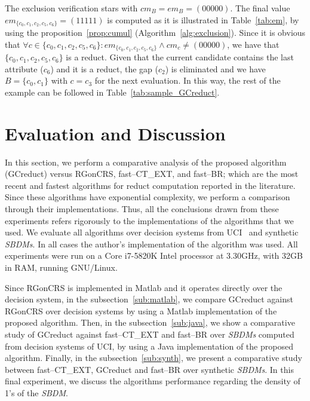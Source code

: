 \documentclass[number,preprint,review,12pt]{elsarticle}
\begin{document}
	The exclusion verification stars with $cm_B = em_B = (00000)$. The final value $em_{\lbrace c_0,c_1,c_2,c_5,c_6\rbrace}=(11111)$ is computed as it is illustrated in Table~\ref{tab:em}, by using the proposition~\ref{prop:cumul} (Algorithm~\ref{alg:exclusion}). Since it is obvious that $\forall c \in \lbrace c_0,c_1,c_2,c_5,c_6\rbrace : em_{\lbrace c_0,c_1,c_2,c_5,c_6\rbrace}\wedge cm_c \neq (00000)$, we have that $\lbrace c_0,c_1,c_2,c_5,c_6\rbrace$ is a reduct. Given that the current candidate contains the last attribute ($c_6$) and it is a reduct, the gap ($c_2$) is eliminated and we have $B = \lbrace c_0,c_1\rbrace$ with $c=c_3$ for the next evaluation. In this way, the rest of the example can be followed in Table~\ref{tab:sample_GCreduct}.

	
%
\section{Evaluation and Discussion}\label{evaluation}
	In this section, we perform a comparative analysis of the proposed algorithm (GCreduct) versus RGonCRS, fast--CT\_EXT, and fast--BR; which are the most recent and fastest algorithms for reduct computation reported in the literature. Since these algorithms have exponential complexity, we perform a comparison through their implementations. Thus, all the conclusions drawn from these experiments refers rigorously to the implementations of the algorithms that we used. We evaluate all algorithms over decision systems from UCI~\cite{Bache13} and synthetic \textit{SBDMs}. In all cases the author's implementation of the algorithm was used. All experiments were run on a Core i7-5820K Intel processor at 3.30GHz, with 32GB in RAM, running GNU/Linux.\label{par:implementation}
	
	Since RGonCRS is implemented in Matlab and it operates directly	over the decision system, in the subsection~\ref{sub:matlab}, we compare GCreduct against RGonCRS over decision systems by using a Matlab implementation of the proposed algorithm. Then, in the subsection~\ref{sub:java}, we show a comparative study of GCreduct against fast--CT\_EXT and fast--BR over \textit{SBDMs} computed from decision systems of UCI, by using a Java implementation of the proposed algorithm. Finally, in the subsection~\ref{sub:synth}, we present a comparative study between fast--CT\_EXT, GCreduct and fast--BR over synthetic \textit{SBDMs}. In this final experiment, we discuss the algorithms performance regarding the density of 1's of the \textit{SBDM}. 
	
\end{document}
